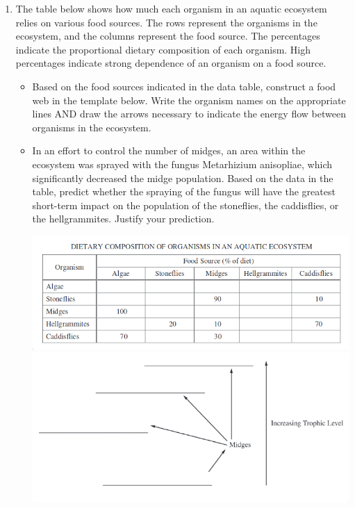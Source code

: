 \documentclass{article}
\begin{document}
\begin{enumerate}
\item The table below shows how much each organism in an aquatic ecosystem relies on
various food sources. The rows represent the organisms in the ecosystem, and the columns
represent the food source. The percentages indicate the proportional dietary composition of each organism. High percentages indicate
strong dependence of an organism on a food source.
\begin{itemize}
\item Based on the food sources indicated in the data table, construct a food web in the template below. Write
the organism names on the appropriate lines AND draw the arrows necessary to indicate the
energy flow between organisms in the ecosystem.
\item In an effort to control the number of midges, an area within the ecosystem was
sprayed with the fungus Metarhizium anisopliae, which significantly decreased the midge
population. Based on the data in the table, predict whether the spraying of the fungus will have the greatest short-term impact on the
population of the stoneflies, the caddisflies, or the hellgrammites. Justify your prediction.
\begin{center}
\includegraphics[scale=0.5]{table}
\includegraphics[scale=0.5]{foodweb}
\end{center}
\end{itemize}
\end{enumerate}
\end{document}
